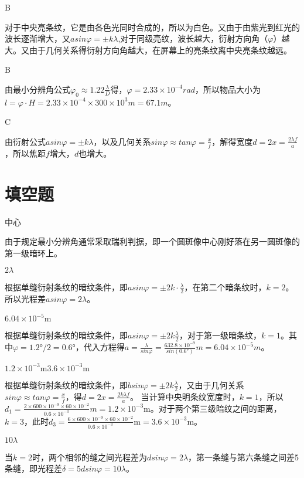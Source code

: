 \exercise B

\solve
对于中央亮条纹，它是由各色光同时合成的，所以为白色。又由于由紫光到红光的波长逐渐增大，又$asin\varphi=\pm k\lambda$,对于同级亮纹，波长越大，衍射方向角（$\varphi$）越大。又由于几何关系得衍射方向角越大，在屏幕上的亮条纹离中央亮条纹越远。

\exercise B

\solve
由最小分辨角公式$\varphi_0\approx1.22\frac{\lambda}{D}$得，$\varphi=2.33\times10^{-4}rad$，所以物品大小为$l=\varphi\cdot H=2.33\times10^{-4}\times300\times10^{3}m=67.1m$。

\exercise C

\solve
由衍射公式$asin\varphi=\pm k\lambda$，以及几何关系$sin\varphi\approx tan\varphi=\frac{x}{f}$，解得宽度$d=2x=\frac{2\lambda f}{a}$，所以焦距$f$增大，$d$也增大。

\section{填空题}
\exercise 中心

\solve
由于规定最小分辨角通常采取瑞利判据，即一个圆斑像中心刚好落在另一圆斑像的第一级暗环上。

\exercise $2\lambda$

\solve
根据单缝衍射条纹的暗纹条件，即$asin\varphi=\pm2k\cdot\frac{\lambda}{2}$，在第二个暗条纹时，$k=2$。所以光程差$asin\varphi=2\lambda$。

\exercise $6.04\times10^{-5}\mathrm{m}$

\solve
根据单缝衍射条纹的暗纹条件，即$asin\varphi=\pm2k\frac{\lambda}{2}$，对于第一级暗条纹，$k=1$。其中$\varphi=1.2°/2=0.6°$，代入方程得$a=\frac{\lambda}{sin\varphi}=\frac{632.8\times10^{-9}}{sin(0.6°)}m=6.04\times10^{-5}m$。

\exercise $1.2\times10^{-3}\mathrm{m}$\quad $3.6\times10^{-3}\mathrm{m}$

\solve
根据单缝衍射条纹的暗纹条件，即$bsin\varphi=\pm2k\frac{\lambda}{2}$，又由于几何关系$sin\varphi\approx tan\varphi=\frac{x}{f}$，得$d=2x=\frac{2k\lambda f}{a}$。 当计算中央明条纹宽度时，$k=1$，所以$d_1=\frac{2\times600\times10^{-9}\times60\times10^{-2}}{0.6\times10^{-3}}m=1.2\times10^{-3}\mathrm{m}$。对于两个第三级暗纹之间的距离，$k=3$，此时$d_3=\frac{6\times600\times10^{-9}\times60\times10^{-2}}{0.6\times10^{-3}}\mathrm{m}=3.6\times10^{-3}\mathrm{m}$。

\exercise $10\lambda$

\solve
当$k=2$时，两个相邻的缝之间光程差为$dsin\varphi=2\lambda$，第一条缝与第六条缝之间差5条缝，即光程差$\delta=5dsin\varphi=10\lambda$。

